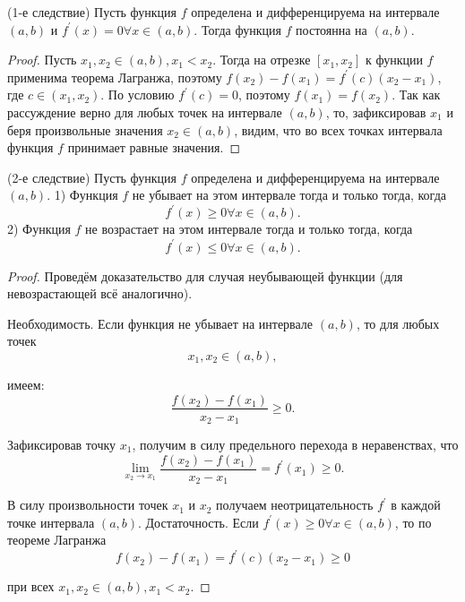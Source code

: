 \begin{proposition}
    (1-е следствие) Пусть функция $f$ определена и дифференцируема на интервале $(a, b)$ и $f^{\prime}(x)=0 \forall x \in(a, b)$. Тогда функция $f$ постоянна на $(a, b)$.
\end{proposition}

\begin{proof}
    Пусть $x_1, x_2 \in(a, b), x_1<x_2$. Тогда на отрезке $\left[x_1, x_2\right]$ к функции $f$ применима теорема Лагранжа, поэтому $f\left(x_2\right)-f\left(x_1\right)=f^{\prime}(c)\left(x_2-x_1\right)$, где $c \in\left(x_1, x_2\right)$. По условию $f^{\prime}(c)=0$, поэтому $f\left(x_1\right)=f\left(x_2\right)$. Так как рассуждение верно для любых точек на интервале $(a, b)$, то, зафиксировав $x_1$ и беря произвольные значения $x_2 \in(a, b)$, видим, что во всех точках интервала функция $f$ принимает равные значения.
\end{proof}

\begin{proposition}
    (2-е следствие) Пусть функция $f$ определена и дифференцируема на интервале $(a, b)$.
    1) Функция $f$ не убывает на этом интервале тогда и только тогда, когда
    $$
        f^{\prime}(x) \geq 0 \forall x \in(a, b) .
    $$
    2) Функция $f$ не возрастает на этом интервале тогда и только тогда, когда
    $$
        f^{\prime}(x) \leq 0 \forall x \in(a, b) .
    $$
\end{proposition}

\begin{proof}
    Проведём доказательство для случая неубывающей функции (для невозрастающей всё аналогично).

    Необходимость. Если функция не убывает на интервале $(a, b)$, то для любых точек
    $$
        x_1, x_2 \in(a, b),
    $$

    имеем:
    $$
        \frac{f\left(x_2\right)-f\left(x_1\right)}{x_2-x_1} \geq 0 .
    $$

    Зафиксировав точку $x_1$, получим в силу предельного перехода в неравенствах, что
    $$
        \lim _{x_2 \rightarrow x_1} \frac{f\left(x_2\right)-f\left(x_1\right)}{x_2-x_1}=f^{\prime}\left(x_1\right) \geq 0 .
    $$

    В силу произвольности точек $x_1$ и $x_2$ получаем неотрицательность $f^{\prime}$ в каждой точке интервала $(a, b)$.
    Достаточность. Если $f^{\prime}(x) \geq 0 \forall x \in(a, b)$, то по теореме Лагранжа
    $$
        f\left(x_2\right)-f\left(x_1\right)=f^{\prime}(c)\left(x_2-x_1\right) \geq 0
    $$

    при всех $x_1, x_2 \in(a, b), x_1<x_2$.
\end{proof}

